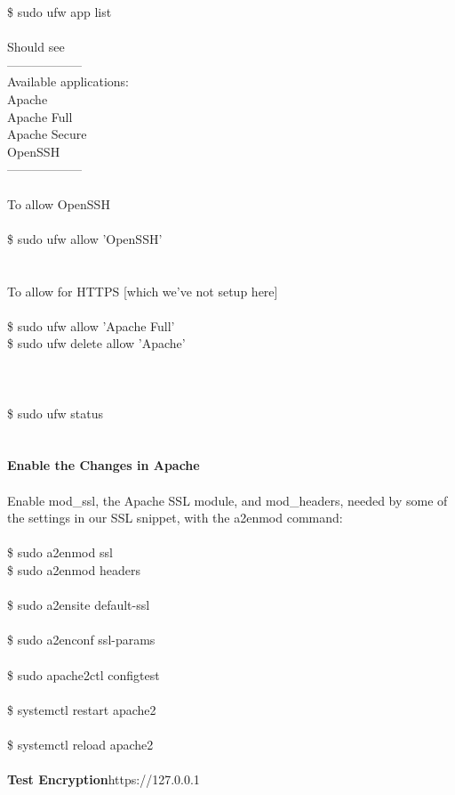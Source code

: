 \documentclass[10pt,a4paper]{article}
\begin{document}
{{{{{{{{{{{{{{{{\$ sudo ufw app list\\
\\
Should see\\
------------------\\
Available applications:\\
  Apache\\
  Apache Full\\
  Apache Secure\\
  OpenSSH\\
------------------\\
\\
To allow OpenSSH\\
\\
\$ sudo ufw allow 'OpenSSH'\\
\\
\\
To allow for HTTPS [which we've not setup here]\\
\\
\$ sudo ufw allow  'Apache Full'\\
\$ sudo ufw delete allow 'Apache'\\
\\
\\
\\
\$ sudo ufw status\\
\\
\\
\textbf{Enable the Changes in Apache}}{\large \\
\\
Enable mod\_ssl, the Apache SSL module, and mod\_headers, needed by some of the settings in our SSL snippet, with the a2enmod command:\\
\\
\$ sudo a2enmod ssl\\
\$ sudo a2enmod headers\\
\\
\$ sudo a2ensite default-ssl\\
\\
\$ sudo a2enconf ssl-params\\
\\
\$ sudo apache2ctl configtest\\
\\
\$ systemctl restart apache2\\
\\
\$ systemctl reload apache2\\
\\
\textbf{Test Encryption}}{\large https://127.0.0.1}{\large \\
}}}}}}}}}}}}}}}}
\end{document}
